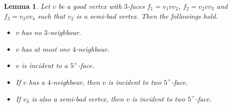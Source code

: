 \documentclass[12pt, reqno]{amsart}
\theoremstyle{plain}
\newtheorem{lemma}[equation]{Lemma}
\theoremstyle{definition}
\numberwithin{equation}{section}
\begin{document}
\begin{lemma}\label{lem:good-properties}
Let $v$ be a good vertex with $3$-faces $f_1=v_1vv_2$, $f_2=v_2vv_3$ and $f_3=v_3vv_4$ such that $v_2$ is a semi-bad vertex. Then the followings hold.
\begin{itemize}
\item[$(a)$] $v$ has no $3$-neighbour. %
\item[$(b)$] $v$ has at most one $4$-neighbour.
\item[$(c)$] $v$ is incident to a $5^+$-face. 
\item[$(d)$] If $v$ has a $4$-neighbour, then $v$ is incident to two $5^+$-face. 
\item[$(e)$] If $v_3$ is also a semi-bad vertex, then $v$ is incident to two $5^+$-face.
\end{itemize}
\end{lemma}
\end{document}
